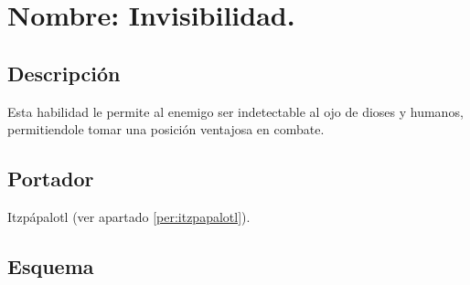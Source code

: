 \section{Nombre: Invisibilidad.} \label{hab.Invis}
\subsection{Descripción}
Esta habilidad le permite al enemigo ser indetectable al ojo de dioses y humanos, permitiendole tomar una posición ventajosa en combate.
\subsection{Portador}
Itzpápalotl (ver apartado \ref{per:itzpapalotl}).
\subsection{Esquema}
			